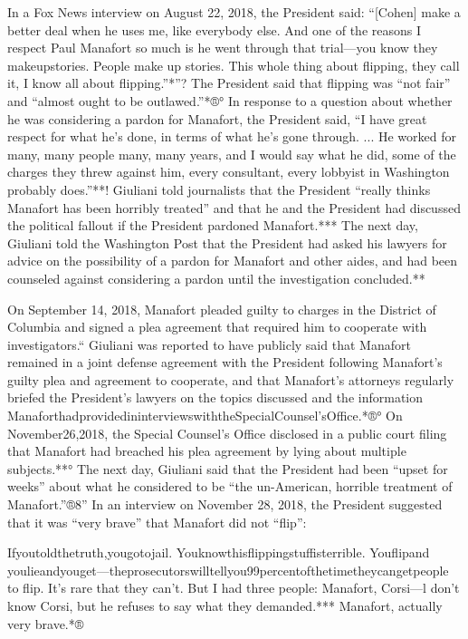 In a Fox News interview on August 22, 2018, the President said: “[Cohen] make a better deal when he uses me, like everybody else. And one of the reasons I respect Paul Manafort so much is he went through that trial—you know they makeupstories. People make up stories. This whole thing about flipping, they call it, I know all about flipping.”*”? The President said that flipping was “not fair” and “almost ought to be outlawed.”*®° In response to a question about whether he was considering a pardon for Manafort, the President said, “I have great respect for what he's done, in terms of what he's gone through. ... He worked for many, many people many, many years, and I would say what he did, some of the charges they threw against him, every consultant, every lobbyist in Washington probably does.”**! Giuliani told journalists that the President “really thinks Manafort has been horribly treated” and that he and the President had discussed the political fallout if the President pardoned Manafort.*** The next day, Giuliani told the Washington Post that the President had asked his lawyers for advice on the possibility of a pardon for Manafort and other aides, and had been counseled against considering a pardon until the investigation concluded.**

On September 14, 2018, Manafort pleaded guilty to charges in the District of Columbia and signed a plea agreement that required him to cooperate with investigators.“ Giuliani was reported to have publicly said that Manafort remained in a joint defense agreement with the President following Manafort's guilty plea and agreement to cooperate, and that Manafort's attorneys regularly briefed the President's lawyers on the topics discussed and the information ManaforthadprovidedininterviewswiththeSpecialCounsel'sOffice.*®° On November26,2018, the Special Counsel's Office disclosed in a public court filing that Manafort had breached his plea agreement by lying about multiple subjects.**° The next day, Giuliani said that the President had been “upset for weeks” about what he considered to be “the un-American, horrible treatment of Manafort.”®8” In an interview on November 28, 2018, the President suggested that it was “very brave” that Manafort did not “flip”:

Ifyoutoldthetruth,yougotojail. Youknowthisflippingstuffisterrible. Youflipand youlieandyouget—theprosecutorswilltellyou99percentofthetimetheycangetpeople to flip. It's rare that they can't. But I had three people: Manafort, Corsi—l don't know
Corsi, but he refuses to say what they demanded.*** Manafort, actually very brave.*®

